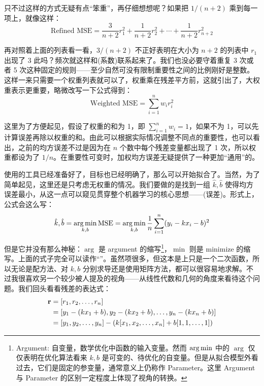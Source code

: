 \begin{itemize}
          只不过这样的方式无疑有点“笨重”，再仔细想想呢？如果把 $1/(n+2)$ 乘到每一项上，就像这样：
          \[
              \text{Refined MSE} = \frac3{n+2} r_1^2 + \frac1{n+2} r_2^2 + \cdots + \frac1{n+2} r_{n+2}^2
          \]

          再对照着上面的列表看一看，$3/(n+2)$ 不正好表明在大小为 $n+2$ 的列表中 $r_1$ 出现了 3 此吗？频次就这样和(系数)联系起来了。我们也没必要守着重复 3 次或者 5 次这种固定的规则——至少自然可没有限制重要性之间的比例刚好是整数。这样一来只需要一个权重列表就可以了，权重乘在残差平方前，这就引出了，大权重表示更重要，略微改写一下公式得到：
          \[
              \text{Weighted MSE} = \sum_{i=1}^n w_i r_i^2
          \]

          这里为了方便起见，假设了权重的和为 1，即 $\sum_{i=1}^n w_i = 1$，如果不为 1，可以先计算误差再除以权重的和。由此可以根据实际情况调整不同点的重要性，也可以看出，之前的均方误差不过是因为在 $n$ 个数中每个残差变量都出现了 1 次，所以权重都设为了 $1/n$。在重要性可变时，加权均方误差无疑提供了一种更加“通用”的。
\end{itemize}

使用的工具已经准备好了，目标也已经明确了，那么可以开始拟合了。当然，为了简单起见，这里还是只考虑无权重的情况。我们要做的是找到一组 $\hat k, \hat b$ 使得均方误差最小，从这一点可以窥见贯穿整个机器学习的核心思想——(误差)。形式上，公式会这么写：
\[
    \hat k, \hat b = \operatorname*{arg\,min}_{k, b} \text{MSE} = \operatorname*{arg\,min}_{k, b} \frac1n \sum_{i=1}^n (y_i - kx_i - b)^2
\]

但是它并没有那么神秘：$\arg$ 是 argument 的缩写\footnote{Argument: 自变量，数学优化中函数的输入变量。然而 $\operatorname*{arg\,min}$ 中的 $\arg$ 仅仅表明在优化算法看来 $k, b$ 是可变的、待优化的自变量。但是从拟合模型外看过去，它们是固定的参变量，通常意义上仍称作 Parameter。这里 Argument 与 Parameter 的区别一定程度上体现了视角的转换。}，$\min$ 则是 minimize 的缩写。上面的式子完全可以读作“”。虽然项很多，但这本是上只是一个二次函数，所以无论是配方法、对 $k, b$ 分别求导还是使用矩阵方法，都可以很容易地求解。不过我很喜欢另一个较少被人提及的视角——从线性代数和几何的角度来看待这个问题。我们回头看看残差的表达式：
\[
    \begin{aligned}
        {\mathbf{r}} & = [r_1, r_2, \ldots, r_n]                                                     \\
          & = [y_1 - (kx_1 + b), y_2 - (kx_2 + b), \ldots, y_n - (kx_n + b)]              \\
          & = [y_1, y_2, \ldots, y_n] - (k [x_1, x_2, \ldots, x_n] + b [1, 1, \ldots, 1]) \\
    \end{aligned}
\]

